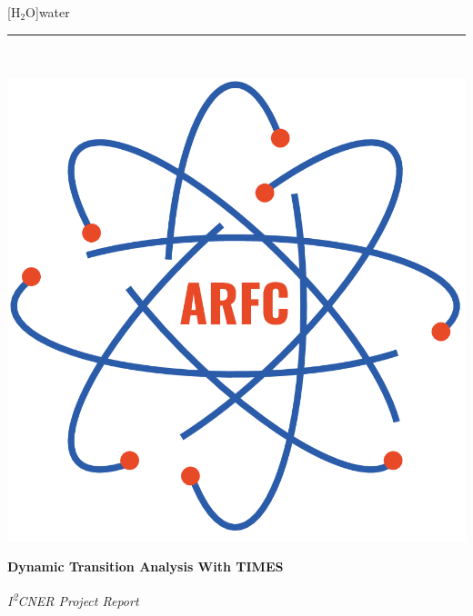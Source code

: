 \documentclass[14pt,a4paper]{article} %
\begin{document}
[$\mathrm{H_2O}$]{water}


\begin{titlepage} %
    \newcommand{\HRule}{\rule{\linewidth}{0.5mm}} %
    
    \center %

    
    \HRule\\[0.2cm]
    
     \begin{minipage}{0.4\textwidth}
        \includegraphics[width=\textwidth]{arfc-logo}
        \end{minipage}%
        \begin{minipage}{0.6\textwidth}
        {\begin{flushright}\huge\bfseries Dynamic Transition Analysis With TIMES\end{flushright}}
        {\begin{flushright}\large\textit{I\textsuperscript{2}CNER Project Report}\end{flushright}}


\end{minipage}
\end{titlepage}
\end{document}
